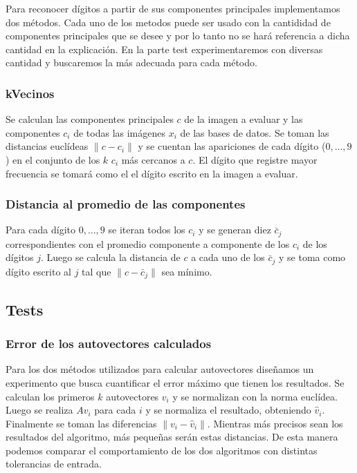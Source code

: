 	\PARstart Para reconocer d\'igitos a partir de sus componentes principales
	implementamos dos m\'etodos. Cada uno de los metodos puede ser usado con la
	cantididad de componentes principales que se desee y por lo tanto no se
	har\'a referencia a dicha cantidad en la explicaci\'on. En la parte test
	experimentaremos con diversas cantidad y buscaremos la m\'as adecuada para
	cada m\'etodo.

	\subsubsection{kVecinos}
		Se calculan las componentes principales $c$ de la imagen a evaluar
		y las componentes $c_i$ de todas las im\'agenes $x_i$ de las bases
		de datos. Se toman las distancias eucl\'ideas $\|c - c_i\|$
		y se cuentan las apariciones de cada d\'igito ($0, \ldots, 9$)
		en el conjunto de los $k$ $c_i$ m\'as cercanos a $c$.
		El d\'igito que registre mayor frecuencia se tomar\'a como el
		el d\'igito escrito en la imagen a evaluar.
	
	\subsubsection{Distancia al promedio de las componentes}
		Para cada d\'igito $0, \ldots, 9$ se iteran todos los $c_i$ 
		y se generan diez $\bar{c}_j$ correspondientes con el
		promedio componente a componente de los $c_i$ de los
		d\'igitos $j$.
		Luego se calcula la distancia de $c$ a cada uno de los $\bar{c}_j$
		y se toma como d\'igito escrito al $j$ tal que $\|c - \bar{c}_j\|$
		sea m\'inimo.

\subsection{Tests}

	\subsubsection{Error de los autovectores calculados}
		Para los dos m\'etodos utilizados para calcular autovectores
		dise\~namos un experimento que busca cuantificar el error m\'aximo
		que tienen los resultados.
		Se calculan los primeros $k$ autovectores $v_i$ y se normalizan con la
		norma eucl\'idea. Luego se realiza $Av_i$ para cada $i$ y se normaliza
		el resultado, obteniendo $\hat{v}_i$. Finalmente se toman las diferencias
		$\|v_i-\hat{v}_i\|$. Mientras m\'as precisos sean los resultados del
		algoritmo, m\'as peque\~nas ser\'an estas distancias.
		De esta manera podemos comparar el comportamiento de los dos algoritmos
		con distintas tolerancias de entrada.

	\subsection{}
